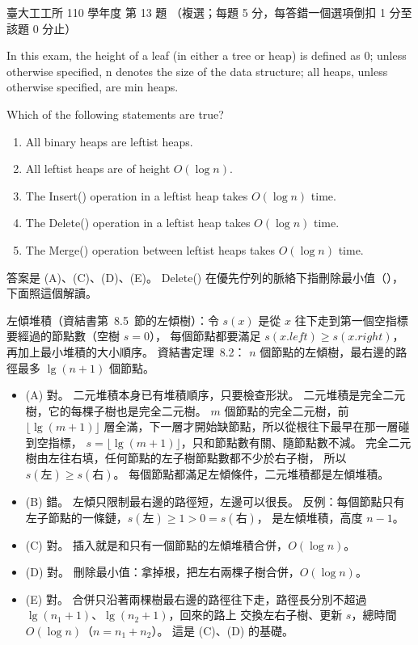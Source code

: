 \begin{pastexam}[label={px:ntu-110-ie-ds-13}]{臺大工工所 110 學年度 第 13 題}
（複選；每題 5 分，每答錯一個選項倒扣 1 分至該題 0 分止）

In this exam, the height of a leaf (in either a tree or heap) is defined as 0; unless otherwise
specified, n denotes the size of the data structure; all heaps, unless otherwise specified, are min heaps.

Which of the following statements are true?
\begin{enumerate}[label=(\Alph*)]
\item All binary heaps are leftist heaps.
\item All leftist heaps are of height $O(\log n)$.
\item The Insert() operation in a leftist heap takes $O(\log n)$ time.
\item The Delete() operation in a leftist heap takes $O(\log n)$ time.
\item The Merge() operation between leftist heaps takes $O(\log n)$ time.
\end{enumerate}
\end{pastexam}

\begin{pastsoln}
答案是 (A)、(C)、(D)、(E)。 Delete() 在優先佇列的脈絡下指刪除最小值（），下面照這個解讀。

左傾堆積（資結書第~8.5~節的左傾樹）：令 $s(x)$ 是從 $x$ 往下走到第一個空指標要經過的節點數（空樹 $s = 0$），
每個節點都要滿足 $s(x.\mathit{left}) \ge s(x.\mathit{right})$，再加上最小堆積的大小順序。 資結書定理~8.2：
$n$ 個節點的左傾樹，最右邊的路徑最多 $\lg(n + 1)$ 個節點。

\begin{itemize}
\item (A) 對。 二元堆積本身已有堆積順序，只要檢查形狀。 二元堆積是完全二元樹，它的每棵子樹也是完全二元樹。
$m$ 個節點的完全二元樹，前 $\lfloor \lg(m + 1) \rfloor$ 層全滿，下一層才開始缺節點，所以從根往下最早在那一層碰到空指標，
$s = \lfloor \lg(m + 1) \rfloor$，只和節點數有關、隨節點數不減。 完全二元樹由左往右填，任何節點的左子樹節點數都不少於右子樹，
所以 $s(\text{左}) \ge s(\text{右})$。 每個節點都滿足左傾條件，二元堆積都是左傾堆積。
\item (B) 錯。 左傾只限制最右邊的路徑短，左邊可以很長。 反例：每個節點只有左子節點的一條鏈，$s(\text{左}) \ge 1 > 0 = s(\text{右})$，
是左傾堆積，高度 $n - 1$。
\item (C) 對。 插入就是和只有一個節點的左傾堆積合併，$O(\log n)$。
\item (D) 對。 刪除最小值：拿掉根，把左右兩棵子樹合併，$O(\log n)$。
\item (E) 對。 合併只沿著兩棵樹最右邊的路徑往下走，路徑長分別不超過 $\lg(n_1 + 1)$、$\lg(n_2 + 1)$，回來的路上
交換左右子樹、更新 $s$，總時間 $O(\log n)$（$n = n_1 + n_2$）。 這是 (C)、(D) 的基礎。
\end{itemize}
\end{pastsoln}
